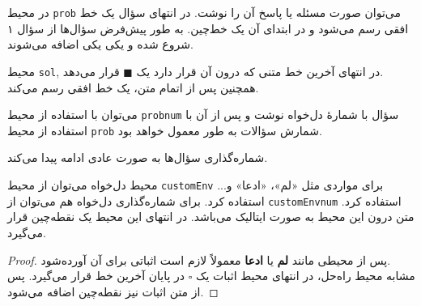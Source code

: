 \begin{prob}
	در محیط
	\texttt{prob}
	می‌توان صورت مسئله یا پاسخ آن را نوشت.  در انتهای سؤال یک خط افقی رسم می‌شود و در ابتدای آن یک خط‌چین. به طور پیش‌فرض سؤال‌ها از سؤال ۱ شروع شده و یکی یکی اضافه می‌شوند.
	
\end{prob}
\begin{sol}
	محیط
	\texttt{sol},
	در انتهای آخرین خط متنی که درون آن قرار دارد یک 
	$ \blacksquare $
	قرار می‌دهد.\\	
	همچنین پس از اتمام متن، یک خط افقی رسم می‌کند.
\end{sol}
\begin{probnum}{10}
می‌توان با استفاده از محیط
\texttt{probnum}
 سؤال با شمارهٔ دل‌خواه نوشت و پس از آن با استفاده از محیط 
 \texttt{prob}
 شمارش سؤالات به طور معمول خواهد بود.
 
\end{probnum}

\begin{prob}
	شماره‌گذاری سؤال‌ها به صورت عادی ادامه پیدا می‌کند.
	
\end{prob}
\begin{customEnv}{محیط دل‌خواه}
	می‌توان از محیط
	\texttt{customEnv}
	برای مواردی مثل «لم»، «ادعا» و... استفاده کرد. برای شماره‌گذاری دل‌خواه هم می‌توان از
	\texttt{customEnvnum}
استفاده کرد. متن درون این محیط به صورت ایتالیک می‌باشد. در انتهای این محیط یک نقطه‌چین قرار می‌گیرد.
\end{customEnv}
\begin{proof}
پس از محیطی مانند
\textbf{لم}
یا
\textbf{ادعا}
معمولاً لازم است اثباتی برای آن آورده‌شود.\\
مشابه محیط راه‌حل، در انتهای محیط اثبات یک 
$\square$
در پایان آخرین خط قرار می‌گیرد. پس از متن اثبات نیز نقطه‌چین اضافه می‌شود.
\end{proof}